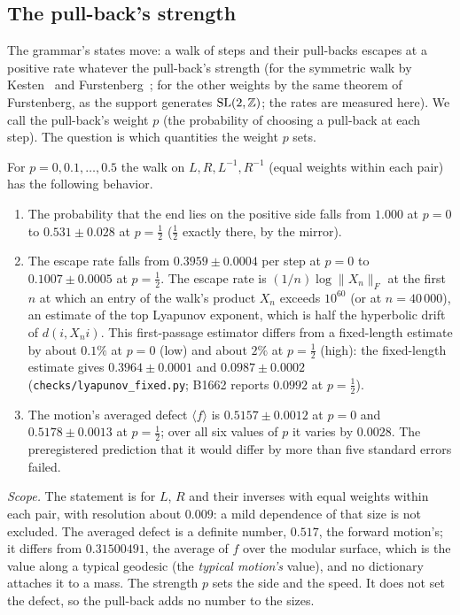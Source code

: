 \subsection{The pull-back's strength}

The grammar's states move: a walk of steps and their pull-backs escapes at a positive rate whatever the pull-back's
strength (for the symmetric walk by Kesten~\cite{Kesten1959} and Furstenberg~\cite{Furstenberg1963}; for the other weights
by the same theorem of Furstenberg, as the support generates $\mathrm{SL}(2,\mathbb{Z})$; the rates are measured here). We call the pull-back's weight $p$ (the probability of choosing a pull-back
at each step). The question is which quantities the weight $p$ sets.

\begin{censuslaw}\label{bd:strength}
For $p=0,0.1,\dots,0.5$ the walk on $L,R,L^{-1},R^{-1}$ (equal weights within each pair) has the following behavior.
\begin{enumerate}
\item The probability that the end lies on the positive side falls from $1.000$ at $p=0$ to $0.531\pm0.028$ at
  $p=\tfrac12$ ($\tfrac12$ exactly there, by the mirror).
\item The escape rate falls from $0.3959\pm0.0004$ per step at $p=0$ to $0.1007\pm0.0005$ at $p=\tfrac12$. The escape rate
  is $(1/n)\log\|X_n\|_F$ at the first $n$ at which an entry of the walk's product $X_n$ exceeds $10^{60}$ (or at
  $n=40\,000$), an estimate of the top Lyapunov exponent, which is half the hyperbolic drift of $d(i,X_n i)$. This
  first-passage estimator differs from a fixed-length estimate by about $0.1\%$ at $p=0$ (low) and about $2\%$ at
  $p=\tfrac12$ (high): the fixed-length estimate gives $0.3964\pm0.0001$ and
  $0.0987\pm0.0002$ (\texttt{checks/lyapunov\_fixed.py}; B1662 reports $0.0992$ at $p=\tfrac12$).
\item The motion's averaged defect $\langle f\rangle$ is $0.5157\pm0.0012$ at $p=0$ and $0.5178\pm0.0013$ at
  $p=\tfrac12$; over all six values of $p$ it varies by $0.0028$. The preregistered prediction that it would differ by
  more than five standard errors failed.
\end{enumerate}
\end{censuslaw}

\emph{Scope.} The statement is for $L$, $R$ and their inverses with equal weights within each pair, with resolution about
$0.009$: a mild dependence of that size is not excluded. The averaged defect is a definite number, $0.517$, the forward
motion's; it differs from $0.31500491$, the average of $f$ over the modular surface, which is the value along a typical geodesic
(the \emph{typical motion's} value), and no dictionary attaches it to a mass. The strength $p$
sets the side and the speed. It does not set the defect, so the pull-back adds no number to the sizes.

